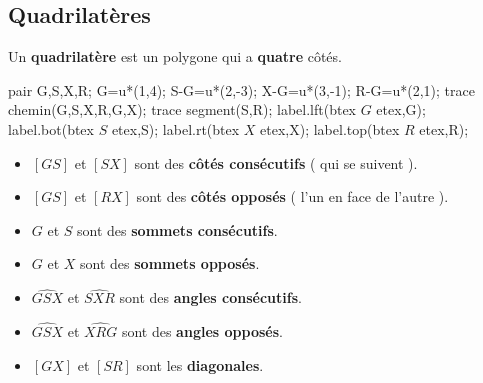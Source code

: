 \begin{changemargin}{-5mm}{-15mm}
    \section{Quadrilatères}
    \begin{definition}
        Un \textbf{quadrilatère} est un polygone qui a \textbf{quatre} côtés.
    \end{definition}
    
    \begin{definition}[Vocabulaire]
        \begin{minipage}{0.3\linewidth}
            \begin{Geometrie}
                pair G,S,X,R;
                G=u*(1,4);
                S-G=u*(2,-3);
                X-G=u*(3,-1);
                R-G=u*(2,1);
                trace chemin(G,S,X,R,G,X);
                trace segment(S,R);
                label.lft(btex $G$ etex,G);
                label.bot(btex $S$ etex,S);
                label.rt(btex $X$ etex,X);
                label.top(btex $R$ etex,R);
            \end{Geometrie}
        \end{minipage}
        \begin{minipage}{0.7\linewidth}
            \begin{itemize}
                \item $[GS]$ et $[SX]$ sont des \textbf{côtés consécutifs} ( qui se suivent ).
                \item $[GS]$ et $[RX]$ sont des \textbf{côtés opposés} ( l'un en face de l'autre ).
                \item $G$ et $S$ sont des \textbf{sommets consécutifs}.
                \item $G$ et $X$ sont des \textbf{sommets opposés}.
                \item $\widehat{GSX}$ et $\widehat{SXR}$ sont des \textbf{angles consécutifs}.
                \item $\widehat{GSX}$ et $\widehat{XRG}$ sont des \textbf{angles opposés}.
                \item $[GX]$ et $[SR]$ sont les \textbf{diagonales}.
            \end{itemize}
        \end{minipage}
    \end{definition}


\end{changemargin}
